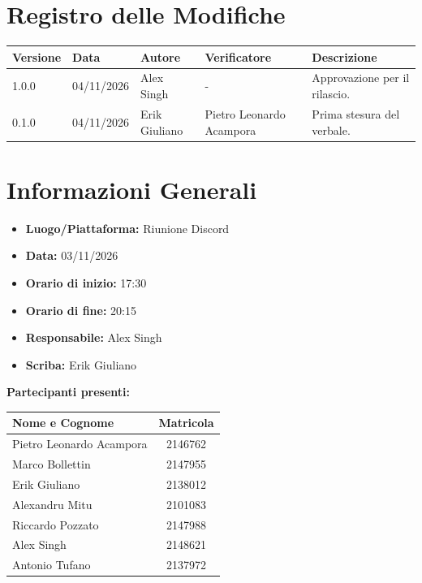 \documentclass[a4paper, 11pt]{article}
\begin{document}
\section*{Registro delle Modifiche}
\vspace{0.5cm}
\begin{center}
\renewcommand{\arraystretch}{1.5}
\begin{tabularx}{\textwidth}{|l|l|l|l|X|}
\hline
\textbf{Versione} & \textbf{Data} & \textbf{Autore} & \textbf{Verificatore} & \textbf{Descrizione} \\ \hline
1.0.0 & 04/11/2026 & Alex Singh & - & Approvazione per il rilascio. \\ \hline
0.1.0 & 04/11/2026 & Erik Giuliano & Pietro Leonardo Acampora & Prima stesura del verbale. \\ \hline
\end{tabularx}
\end{center}

\newpage

\tableofcontents
\newpage

\section{Informazioni Generali}
\begin{itemize}
    \item \textbf{Luogo/Piattaforma:} Riunione Discord
    \item \textbf{Data:} 03/11/2026
    \item \textbf{Orario di inizio:} 17:30
    \item \textbf{Orario di fine:} 20:15
    \item \textbf{Responsabile:} Alex Singh
    \item \textbf{Scriba:} Erik Giuliano
\end{itemize}

\vspace{0.5cm}
\textbf{Partecipanti presenti:} \\
\vspace{0.2cm}
\renewcommand{\arraystretch}{1.2}
\begin{tabularx}{0.8\textwidth}{|X|c|}
\hline
\textbf{Nome e Cognome} & \textbf{Matricola} \\ \hline
Pietro Leonardo Acampora & 2146762 \\ \hline
Marco Bollettin & 2147955 \\ \hline
Erik Giuliano & 2138012 \\ \hline
Alexandru Mitu & 2101083 \\ \hline
Riccardo Pozzato & 2147988 \\ \hline
Alex Singh & 2148621 \\ \hline
Antonio Tufano & 2137972 \\ \hline
\end{tabularx}
\end{document}
